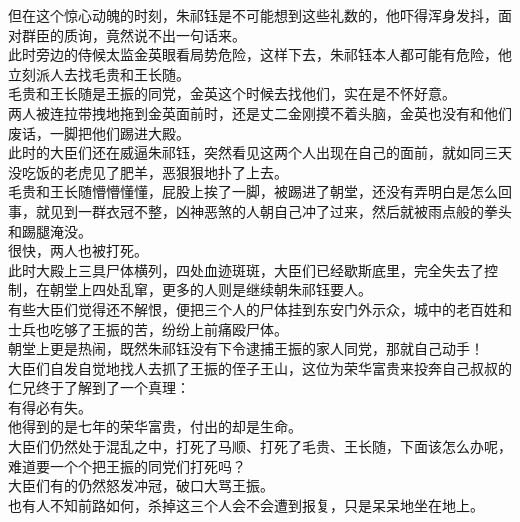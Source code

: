\begin{multicols}{\theparacolNo}
但在这个惊心动魄的时刻，朱祁钰是不可能想到这些礼数的，他吓得浑身发抖，面对群臣的质询，竟然说不出一句话来。\\

此时旁边的侍候太监金英眼看局势危险，这样下去，朱祁钰本人都可能有危险，他立刻派人去找毛贵和王长随。\\

毛贵和王长随是王振的同党，金英这个时候去找他们，实在是不怀好意。\\

两人被连拉带拽地拖到金英面前时，还是丈二金刚摸不着头脑，金英也没有和他们废话，一脚把他们踢进大殿。\\

此时的大臣们还在威逼朱祁钰，突然看见这两个人出现在自己的面前，就如同三天没吃饭的老虎见了肥羊，恶狠狠地扑了上去。\\

毛贵和王长随懵懵懂懂，屁股上挨了一脚，被踢进了朝堂，还没有弄明白是怎么回事，就见到一群衣冠不整，凶神恶煞的人朝自己冲了过来，然后就被雨点般的拳头和踢腿淹没。\\

很快，两人也被打死。\\

此时大殿上三具尸体横列，四处血迹斑斑，大臣们已经歇斯底里，完全失去了控制，在朝堂上四处乱窜，更多的人则是继续朝朱祁钰要人。\\

有些大臣们觉得还不解恨，便把三个人的尸体挂到东安门外示众，城中的老百姓和士兵也吃够了王振的苦，纷纷上前痛殴尸体。\\

朝堂上更是热闹，既然朱祁钰没有下令逮捕王振的家人同党，那就自己动手！\\

大臣们自发自觉地找人去抓了王振的侄子王山，这位为荣华富贵来投奔自己叔叔的仁兄终于了解到了一个真理：\\

有得必有失。\\

他得到的是七年的荣华富贵，付出的却是生命。\\

大臣们仍然处于混乱之中，打死了马顺、打死了毛贵、王长随，下面该怎么办呢，难道要一个个把王振的同党们打死吗？\\

大臣们有的仍然怒发冲冠，破口大骂王振。\\

也有人不知前路如何，杀掉这三个人会不会遭到报复，只是呆呆地坐在地上。\\


\end{multicols}
